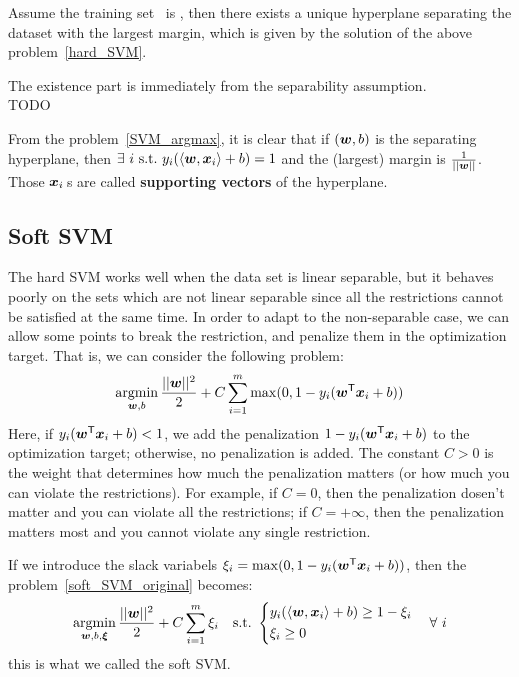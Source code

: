 \begin{thm}
    Assume the training set \dataset\ is , then there exists a unique hyperplane 
    separating the dataset with the largest margin, which is given by the solution of the above 
    problem~\eqref{hard_SVM}.
\end{thm}
\begin{pf}
    The existence part is immediately from the separability assumption.\\
    TODO
\end{pf}

\begin{re}
    From the problem~\eqref{SVM_argmax}, it is clear that if $(\boldsymbol{w}, b)$ is the separating hyperplane, then
    $\exists~i\ \text{s.t.\ } y_i(\langle\boldsymbol{w}, \boldsymbol{x}_i\rangle + b) = 1$ and the (largest) margin is $\frac{1}{||\boldsymbol{w}||}$.
    Those $\boldsymbol{x}_i$\,s are called \textbf{supporting vectors} of the hyperplane.
\end{re}

\subsection{Soft SVM}
The hard SVM works well when the data set is linear separable, but it behaves poorly on the sets which are not
linear separable since all the restrictions cannot be satisfied at the same time. In order to adapt to the 
non-separable case, we can allow some points to break the restriction, and penalize them in the optimization
target. That is, we can consider the following problem:
\begin{equation}\label{soft_SVM_original}
    \operatorname*{argmin}_{\boldsymbol{w}, b} \frac{||\boldsymbol{w}||^2}{2} + C\sum_{i=1}^{m}\max(0, 1 - y_i({\boldsymbol{w}}^\mathsf{T}\boldsymbol{x}_i +b))
\end{equation}
Here, if $y_i({\boldsymbol{w}}^\mathsf{T}\boldsymbol{x}_i +b) < 1$, we add the penalization $1 - y_i({\boldsymbol{w}}^\mathsf{T}\boldsymbol{x}_i +b)$ to the 
optimization target; otherwise, no penalization is added. The constant $C > 0$ is the weight that determines 
how much the penalization matters (or how much you can violate the restrictions). For example, if $C = 0$, 
then the penalization dosen't matter and you can violate all the restrictions; if $C = +\infty$, then the 
penalization matters most and you cannot violate any single restriction.\par
If we introduce the slack variabels $\xi_i = \max(0, 1 - y_i({\boldsymbol{w}}^\mathsf{T}\boldsymbol{x}_i +b))$, then
the problem~\eqref{soft_SVM_original} becomes:
\begin{equation}\label{soft_SVM}
    \operatorname*{argmin}_{\boldsymbol{w}, b, \boldsymbol{\xi}} \frac{||\boldsymbol{w}||^2}{2} + C\sum_{i=1}^{m}\xi_i\quad\text{s.t.\ }\left\{
    \begin{aligned}
    & y_i(\langle\boldsymbol{w}, \boldsymbol{x}_i\rangle + b) \geq 1 - \xi_i\\
    & \xi_i \geq 0 
    \end{aligned}\right.
    \quad\forall~i
\end{equation}
this is what we called the soft SVM\@.

